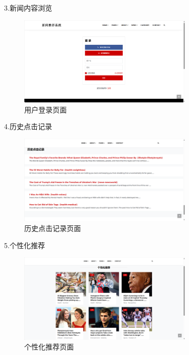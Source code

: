 \documentclass[withoutpreface,bwprint]{cumcmthesis} %
\begin{document}
	3.新闻内容浏览\par
	\begin{figure}[H]
		\centering
		\includegraphics[width=0.75\textwidth]{用户登录页面}
		\caption{用户登录页面}
		\label{fig:circuit-diagcam}
	\end{figure}
	
	4.历史点击记录\par
	\begin{figure}[H]
		\centering
		\includegraphics[width=0.75\textwidth]{历史点击记录页面}
		\caption{历史点击记录页面}
		\label{fig:circuit-diagcam}
	\end{figure}
	5.个性化推荐\par
	\begin{figure}[H]
		\centering
		\includegraphics[width=0.75\textwidth]{个性化推荐页面}
		\caption{个性化推荐页面}
		\label{fig:circuit-diagcam}
	\end{figure}
\end{document}
